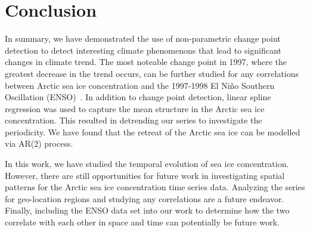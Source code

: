 \documentclass[12pt]{article}
\begin{document}
\section{Conclusion} \label{sec:conclusion}
In summary, we have demonstrated the use of non-parametric change point detection to detect interesting climate phenomenons that lead to significant changes in climate trend. The most noteable change point in 1997, where the greatest decrease in the trend occurs, can be further studied for any correlations between Arctic sea ice concentration and the 1997-1998 El Niño Southern Oscillation (ENSO)~\citep{elnino}. In addition to change point detection, linear spline regression was used to capture the mean structure in the Arctic sea ice concentration. This resulted in detrending our series to investigate the periodicity. We have found that the retreat of the Arctic sea ice can be modelled via AR(2) process.

In this work, we have studied the temporal evolution of sea ice concentration. However, there are still opportunities for future work in investigating spatial patterns for the Arctic sea ice concentration time series data. Analyzing the series for geo-location regions and studying any correlations are a future endeavor. Finally, including the ENSO data set into our work to determine how the two correlate with each other in space and time can potentially be future work.



\end{document}
